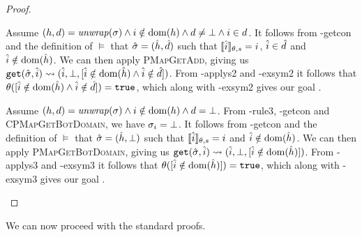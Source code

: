 \begin{proof}

\begin{hypvlist}
 Assume $(h,d)=\operatorname{\mathit{unwrap}}(\sigma) \land i\notin\operatorname{dom}(h) \land d\neq\bot \land i\in d$.
 It follows from \hyp{getcon} and the definition of $\models$ that $\hat{\sigma}=(\hat{h}, \hat{d})$ such that $\llbracket\hat{i}\rrbracket_{\theta,s}=i$, $\hat{i}\in \hat{d}$ and $\hat{i}\notin \operatorname{dom}(\hat{h})$.
 We can then apply \textsc{PMapGetAdd}, giving us $\texttt{get}(\hat{\sigma},\hat{i})\rightsquigarrow(\hat{i},\bot,[\hat{i}\notin \operatorname{dom}(\hat{h}) \land \hat{i}\notin \hat{d}])$.%
 From \hyp{applys2} and \hyp{exsym2} it follows that $\theta([\hat{i}\notin \operatorname{dom}(\hat{h}) \land \hat{i}\notin \hat{d}])=\texttt{true}$, which along with \hyp{exsym2} gives our goal .
\end{hypvlist}


\begin{hypvlist}
 Assume $(h,d)=\operatorname{\mathit{unwrap}}(\sigma) \land i\notin\operatorname{dom}(h) \land d=\bot$.
 From \hyp{rule3}, \hyp{getcon} and \textsc{CPMapGetBotDomain}, we have $\sigma_i=\bot$.
 It follows from \hyp{getcon} and the definition of $\models$ that $\hat{\sigma}=(\hat{h}, \bot)$ such that $\llbracket\hat{i}\rrbracket_{\theta,s}=i$ and $\hat{i}\notin \operatorname{dom}(\hat{h})$.
 We can then apply \textsc{PMapGetBotDomain}, giving us $\texttt{get}(\hat{\sigma},\hat{i})\rightsquigarrow(\hat{i},\bot,[\hat{i}\notin \operatorname{dom}(\hat{h})])$.%
 From \hyp{applys3} and \hyp{exsym3} it follows that $\theta([\hat{i}\notin \operatorname{dom}(\hat{h})])=\texttt{true}$, which along with \hyp{exsym3} gives our goal .
\end{hypvlist}

\end{proof}

We can now proceed with the standard proofs.

